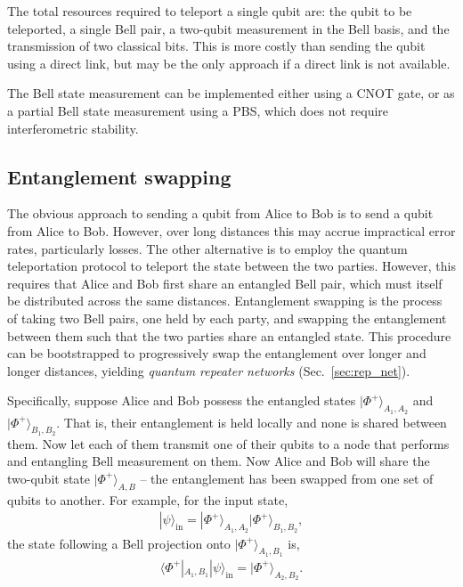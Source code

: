 \documentclass[aps,rmp,twocolumn,amsmath,amssymb,nofootinbib,superscriptaddress,longbibliography,floatfix]{revtex4-1}
\newcommand{\bra}[1]{\langle#1|}
\newcommand{\ket}[1]{|#1\rangle}
\begin{document}
The total resources required to teleport a single qubit are: the qubit to be teleported, a single Bell pair, a two-qubit measurement in the Bell basis, and the transmission of two classical bits. This is more costly than sending the qubit using a direct link, but may be the only approach if a direct link is not available.

The Bell state measurement can be implemented either using a CNOT gate, or as a partial Bell state measurement using a PBS, which does not require interferometric stability.

%
%

\subsection{Entanglement swapping} \label{sec:repeater}

The obvious approach to sending a qubit from Alice to Bob is to send a qubit from Alice to Bob. However, over long distances this may accrue impractical error rates, particularly losses. The other alternative is to employ the quantum teleportation protocol to teleport the state between the two parties. However, this requires that Alice and Bob first share an entangled Bell pair, which must itself be distributed across the same distances. Entanglement swapping is the process of taking two Bell pairs, one held by each party, and swapping the entanglement between them such that the two parties share an entangled state. This procedure can be bootstrapped to progressively swap the entanglement over longer and longer distances, yielding \emph{quantum repeater networks} (Sec.~\ref{sec:rep_net}).

Specifically, suppose Alice and Bob possess the entangled states $\ket{\Phi^+}_{A_1,A_2}$ and $\ket{\Phi^+}_{B_1,B_2}$. That is, their entanglement is held locally and none is shared between them. Now let each of them transmit one of their qubits to a node that performs and entangling Bell measurement on them. Now Alice and Bob will share the two-qubit state $\ket{\Phi^+}_{A,B}$ -- the entanglement has been swapped from one set of qubits to another. For example, for the input state,
\begin{align}
\ket\psi_\mathrm{in} = \ket{\Phi^+}_{A_1,A_2} \ket{\Phi^+}_{B_1,B_2},
\end{align}
the state following a Bell projection onto $\ket{\Phi^+}_{A_1,B_1}$ is,
\begin{align}
\bra{\Phi^+}_{A_1,B_1} \ket\psi_\mathrm{in} = \ket{\Phi^+}_{A_2,B_2}.
\end{align}
\end{document}
